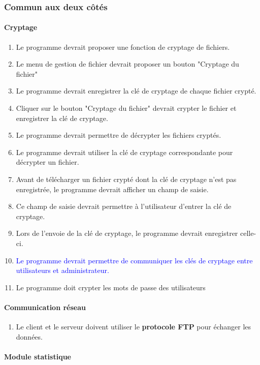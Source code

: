 \documentclass[10pt,a4paper]{report}
\begin{document}
\subsubsection{Commun aux deux côtés}
\paragraph{Cryptage}
	\begin{enumerate}
		\item Le programme devrait proposer une fonction de cryptage de fichiers.
		\item Le menu de gestion de fichier devrait proposer un bouton "Cryptage du fichier"
		\item Le programme devrait enregistrer la clé de cryptage de chaque fichier crypté.
		\item Cliquer sur le bouton "Cryptage du fichier" devrait crypter le fichier et enregistrer la clé de cryptage.
		\item Le programme devrait permettre de décrypter les fichiers cryptés.
		\item Le programme devrait utiliser la clé de cryptage correspondante pour décrypter un fichier.
		\item Avant de télécharger un fichier crypté dont la clé de cryptage n'est pas enregistrée, le programme devrait afficher un champ de saisie.
		\item Ce champ de saisie devrait permettre à l'utilisateur d'entrer la clé de cryptage.
		\item Lors de l'envoie de la clé de cryptage, le programme devrait enregistrer celle-ci.
		\item \textcolor{blue}{Le programme devrait permettre de communiquer les clés de cryptage entre utilisateurs et administrateur.}
		\item Le programme doit crypter les mots de passe des utilisateurs
	\end{enumerate}
	
\paragraph{Communication réseau}

	\begin{enumerate}
		\item Le client et le serveur doivent utiliser le \textbf{protocole FTP} pour échanger les données.
	\end{enumerate}
	
\paragraph{Module statistique }
\end{document}
